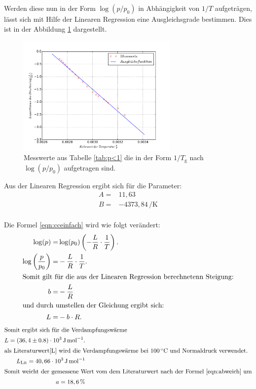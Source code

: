 \FloatBarrier
Werden diese nun in der Form $\log(p/p_\mathrm{0})$ in Abhängigkeit von
$1/T$ aufgeträgen,
lässt sich mit Hilfe der Linearen Regression eine
Ausgleichsgrade bestimmen.
Dies ist in der Abbildung \ref{abb:plot1} dargestellt.
\begin{figure}
  \centering
  \includegraphics[width=0.7\textwidth]{plot1.pdf}
  \caption{Messwerte aus Tabelle \ref{tab:p<1} die in der Form $1/T_\mathrm{g}$ nach $\log(p/p_\mathrm{0})$ aufgetragen sind.}
  \label{abb:plot1}
\end{figure}
\FloatBarrier
Aus der Linearen Regression ergibt sich für die Parameter:
\begin{align*}
  A=&   11,63\\
  B=&  -4373,84\,\si{\per\kelvin}
\end{align*}
\\
Die Formel \eqref{eqn:cceinfach} wird wie folgt verändert:
\begin{align}
\log(p)=& \log(p_\mathrm{0})\left(-\frac{L}{R}\cdot\frac{1}{T}\right).\\
\log\left(\frac{p}{p_\mathrm{0}}\right)=&-\frac{L}{R}\cdot\frac{1}{T}.\\
\intertext{Somit gilt für die aus der Linearen Regression berechnetenn Steigung:}
b=&-\frac{L}{R}\\
\intertext{und durch umstellen der Gleichung ergibt sich:}
L=&-b\cdot R.\\
\end{align}
\begin{align*}
\intertext{Somit ergibt sich für die Verdampfungswärme }
L=(36,4\pm0.8)\cdot 10^3 \,\si{\joule\per\mol}.\\
\intertext{als Literaturwert\cite{L} wird die Verdampfungswärme bei $100\,\si{\degreeCelsius}$ und Normaldruck verwendet.}
L_\mathrm{Lit}= 40,66\cdot 10^3 \,\si{\joule\per\mol}\\
\intertext{Somit weicht der gemessene Wert vom dem Literaturwert nach der Formel \eqref{eqn:abweich} um}
a=18,6 \,\si{\percent}
\end{align*}
